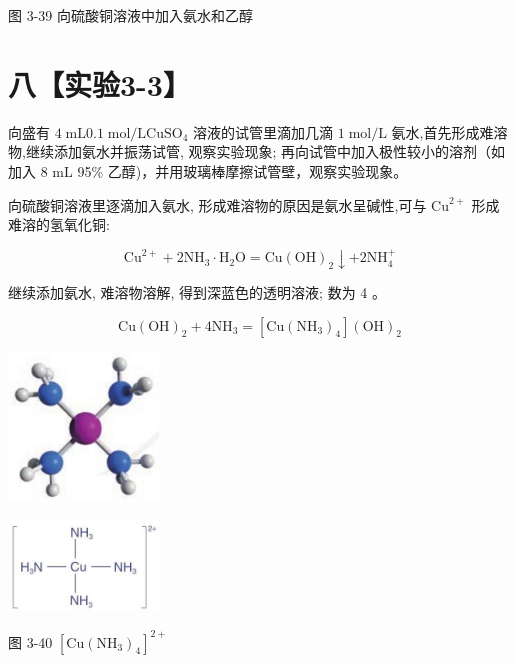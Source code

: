 \documentclass[10pt]{article}
\begin{document}
图 3-39 向硫酸铜溶液中加入氨水和乙醇

\section*{八【实验3-3】}

向盛有 \(4\mathrm{\;{mL}}{0.1}\mathrm{\;{mol}}/\mathrm{L}{\mathrm{{CuSO}}}_{4}\) 溶液的试管里滴加几滴 \(1\mathrm{\;{mol}}/\mathrm{L}\) 氨水,首先形成难溶物,继续添加氨水并振荡试管, 观察实验现象; 再向试管中加入极性较小的溶剂（如加入 8 mL 95\% 乙醇)，并用玻璃棒摩擦试管壁，观察实验现象。

向硫酸铜溶液里逐滴加入氨水, 形成难溶物的原因是氨水呈碱性,可与 \({\mathrm{{Cu}}}^{2 + }\) 形成难溶的氢氧化铜:

\[
{\mathrm{{Cu}}}^{2 + } + 2{\mathrm{{NH}}}_{3} \cdot {\mathrm{H}}_{2}\mathrm{O} = \mathrm{{Cu}}{\left( \mathrm{{OH}}\right) }_{2} \downarrow + 2{\mathrm{{NH}}}_{4}^{ + }
\]

继续添加氨水, 难溶物溶解, 得到深蓝色的透明溶液; 数为 4 。

\[
\mathrm{{Cu}}{\left( \mathrm{{OH}}\right) }_{2} + 4{\mathrm{{NH}}}_{3} = \left\lbrack {\mathrm{{Cu}}{\left( {\mathrm{{NH}}}_{3}\right) }_{4}}\right\rbrack {\left( \mathrm{{OH}}\right) }_{2}
\]

\begin{center}
\includegraphics[max width=0.3\textwidth]{images/0190e026-5a11-7df7-bd27-54d09026ba7a_99_585088.jpg}
\end{center}

\begin{center}
\includegraphics[max width=0.3\textwidth]{images/0190e026-5a11-7df7-bd27-54d09026ba7a_99_686664.jpg}
\end{center}

图 3-40 \({\left\lbrack \mathrm{{Cu}}{\left( {\mathrm{{NH}}}_{3}\right) }_{4}\right\rbrack }^{2 + }\)
\end{document}
